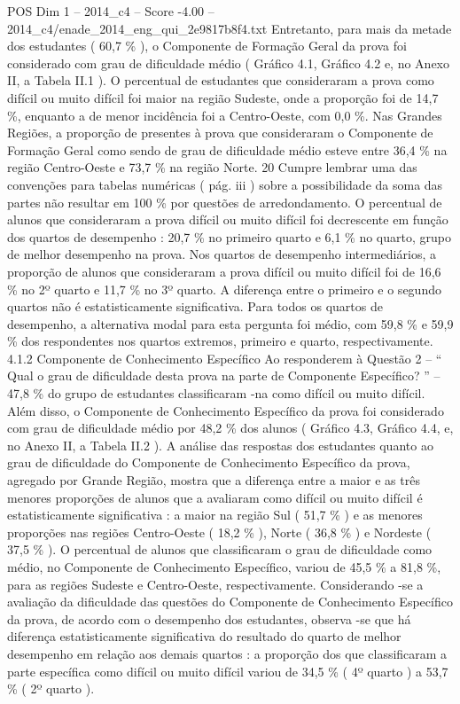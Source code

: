 \begin{textsample}{POS Dim 1 – 2014\_c4 – Score -4.00 – 2014\_c4/enade\_2014\_eng\_qui\_2e9817b8f4.txt}
Entretanto, para mais da metade dos estudantes ( 60,7 \% ), o Componente de Formação Geral da prova foi considerado com grau de dificuldade médio ( Gráfico 4.1, Gráfico 4.2 e, no Anexo II, a Tabela II.1 ).
O percentual de estudantes que consideraram a prova como difícil ou muito difícil foi maior na região Sudeste, onde a proporção foi de 14,7 \%, enquanto a de menor incidência foi a Centro-Oeste, com 0,0 \%.
Nas Grandes Regiões, a proporção de presentes à prova que consideraram o Componente de Formação Geral como sendo de grau de dificuldade médio esteve entre 36,4 \% na região Centro-Oeste e 73,7 \% na região Norte. 20 Cumpre lembrar uma das convenções para tabelas numéricas ( pág. iii ) sobre a possibilidade da soma das partes não resultar em 100 \% por questões de arredondamento.
O percentual de alunos que consideraram a prova difícil ou muito difícil foi decrescente em função dos quartos de desempenho : 20,7 \% no primeiro quarto e 6,1 \% no quarto, grupo de melhor desempenho na prova.
Nos quartos de desempenho intermediários, a proporção de alunos que consideraram a prova difícil ou muito difícil foi de 16,6 \% no 2º quarto e 11,7 \% no 3º quarto.
A diferença entre o primeiro e o segundo quartos não é estatisticamente significativa.
Para todos os quartos de desempenho, a alternativa modal para esta pergunta foi médio, com 59,8 \% e 59,9 \% dos respondentes nos quartos extremos, primeiro e quarto, respectivamente. 4.1.2 Componente de Conhecimento Específico Ao responderem à Questão 2 – “ Qual o grau de dificuldade desta prova na parte de Componente Específico? ” – 47,8 \% do grupo de estudantes classificaram -na como difícil ou muito difícil.
Além disso, o Componente de Conhecimento Específico da prova foi considerado com grau de dificuldade médio por 48,2 \% dos alunos ( Gráfico 4.3, Gráfico 4.4, e, no Anexo II, a Tabela II.2 ).
A análise das respostas dos estudantes quanto ao grau de dificuldade do Componente de Conhecimento Específico da prova, agregado por Grande Região, mostra que a diferença entre a maior e as três menores proporções de alunos que a avaliaram como difícil ou muito difícil é estatisticamente significativa : a maior na região Sul ( 51,7 \% ) e as menores proporções nas regiões Centro-Oeste ( 18,2 \% ), Norte ( 36,8 \% ) e Nordeste ( 37,5 \% ).
O percentual de alunos que classificaram o grau de dificuldade como médio, no Componente de Conhecimento Específico, variou de 45,5 \% a 81,8 \%, para as regiões Sudeste e Centro-Oeste, respectivamente.
Considerando -se a avaliação da dificuldade das questões do Componente de Conhecimento Específico da prova, de acordo com o desempenho dos estudantes, observa -se que há diferença estatisticamente significativa do resultado do quarto de melhor desempenho em relação aos demais quartos : a proporção dos que classificaram a parte específica como difícil ou muito difícil variou de 34,5 \% ( 4º quarto ) a 53,7 \% ( 2º quarto ).

\end{textsample}
